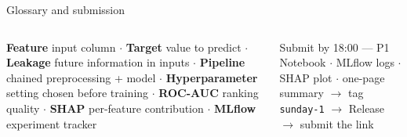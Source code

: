 \documentclass[aspectratio=169,11pt]{beamer}
\begin{document}
\begin{frame}{Glossary and submission}
\begin{columns}[T]
\begin{bdef}[Glossary]
\textbf{Feature} input column $\cdot$ \textbf{Target} value to predict $\cdot$ \textbf{Leakage} future information in inputs $\cdot$ \textbf{Pipeline} chained preprocessing + model $\cdot$ \textbf{Hyperparameter} setting chosen before training $\cdot$ \textbf{ROC-AUC} ranking quality $\cdot$ \textbf{SHAP} per-feature contribution $\cdot$ \textbf{MLflow} experiment tracker
\end{bdef}
\begin{block}{Submit by 18:00 --- P1}
Notebook $\cdot$ MLflow logs $\cdot$ SHAP plot $\cdot$ one-page summary $\rightarrow$ tag \texttt{sunday-1} $\rightarrow$ Release $\rightarrow$ submit the link
\end{block}
\end{columns}
\end{frame}
\end{document}
